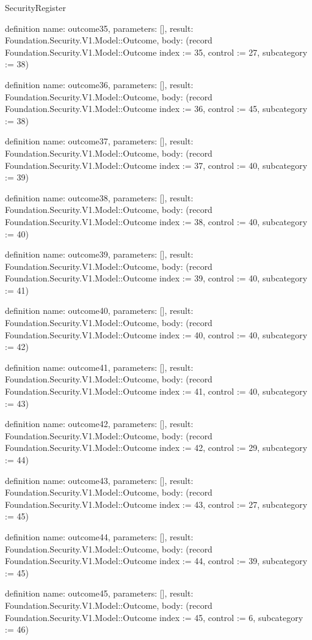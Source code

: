 \begin{lexlean}{SecurityRegister}
\begin{semanticmodule}
definition{
  name: outcome35,
  parameters: [],
  result: Foundation.Security.V1.Model::Outcome,
  body: (record Foundation.Security.V1.Model::Outcome {index := 35, control := 27, subcategory := 38})
}

definition{
  name: outcome36,
  parameters: [],
  result: Foundation.Security.V1.Model::Outcome,
  body: (record Foundation.Security.V1.Model::Outcome {index := 36, control := 45, subcategory := 38})
}

definition{
  name: outcome37,
  parameters: [],
  result: Foundation.Security.V1.Model::Outcome,
  body: (record Foundation.Security.V1.Model::Outcome {index := 37, control := 40, subcategory := 39})
}

definition{
  name: outcome38,
  parameters: [],
  result: Foundation.Security.V1.Model::Outcome,
  body: (record Foundation.Security.V1.Model::Outcome {index := 38, control := 40, subcategory := 40})
}

definition{
  name: outcome39,
  parameters: [],
  result: Foundation.Security.V1.Model::Outcome,
  body: (record Foundation.Security.V1.Model::Outcome {index := 39, control := 40, subcategory := 41})
}

definition{
  name: outcome40,
  parameters: [],
  result: Foundation.Security.V1.Model::Outcome,
  body: (record Foundation.Security.V1.Model::Outcome {index := 40, control := 40, subcategory := 42})
}

definition{
  name: outcome41,
  parameters: [],
  result: Foundation.Security.V1.Model::Outcome,
  body: (record Foundation.Security.V1.Model::Outcome {index := 41, control := 40, subcategory := 43})
}

definition{
  name: outcome42,
  parameters: [],
  result: Foundation.Security.V1.Model::Outcome,
  body: (record Foundation.Security.V1.Model::Outcome {index := 42, control := 29, subcategory := 44})
}

definition{
  name: outcome43,
  parameters: [],
  result: Foundation.Security.V1.Model::Outcome,
  body: (record Foundation.Security.V1.Model::Outcome {index := 43, control := 27, subcategory := 45})
}

definition{
  name: outcome44,
  parameters: [],
  result: Foundation.Security.V1.Model::Outcome,
  body: (record Foundation.Security.V1.Model::Outcome {index := 44, control := 39, subcategory := 45})
}

definition{
  name: outcome45,
  parameters: [],
  result: Foundation.Security.V1.Model::Outcome,
  body: (record Foundation.Security.V1.Model::Outcome {index := 45, control := 6, subcategory := 46})
}


\end{semanticmodule}
\end{lexlean}
